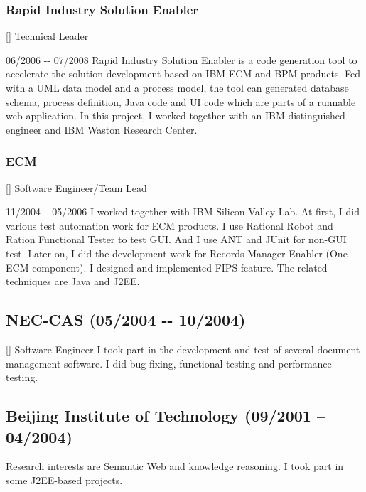 \documentclass[a4paper]{article}
\newenvironment{DUlineblock}[1]{%
    \list{}{\setlength{\partopsep}{\parskip}
            \addtolength{\partopsep}{\baselineskip}
            \setlength{\topsep}{0pt}
            \setlength{\itemsep}{0.15\baselineskip}
            \setlength{\parsep}{0pt}
            \setlength{\leftmargin}{#1}}
    \raggedright
  }
  {\endlist}
\begin{document}
\begin{CJK}{UTF8}{gkai}
\subsubsection*{Rapid Industry Solution Enabler}
\begin{DUlineblock}{0em}
\item[] Technical Leader
\item[] 06/2006 -{}- 07/2008
\end{DUlineblock}
Rapid Industry Solution Enabler is a code generation tool to accelerate the
solution development based on IBM ECM and BPM products. Fed with a UML data
model and a process model, the tool can generated database schema, process
definition, Java code and UI code which are parts of a runnable web application.
In this project, I worked together with an IBM distinguished engineer and IBM Waston
Research Center.

\subsubsection*{ECM}
\begin{DUlineblock}{0em}
\item[] Software Engineer/Team Lead
\item[] 11/2004 – 05/2006
\end{DUlineblock}
I worked together with IBM Silicon Valley Lab. At first, I did various test
automation work for ECM products.  I use Rational Robot and Ration Functional
Tester to test GUI.  And I use ANT and JUnit for non-GUI test. Later on, I did
the development work for Records Manager Enabler (One ECM component). I
designed and implemented FIPS feature. The related techniques are Java and
J2EE.

\subsection*{NEC-CAS (05/2004 -{}- 10/2004)}
\begin{DUlineblock}{0em}
\item[] Software Engineer
\end{DUlineblock}
I took part in the development and test of several document management
software.  I did bug fixing, functional testing and performance testing.

\subsection*{Beijing Institute of Technology (09/2001 – 04/2004)}
Research interests are Semantic Web and knowledge reasoning.
I took part in some J2EE-based projects.


\end{CJK}
\end{document}
